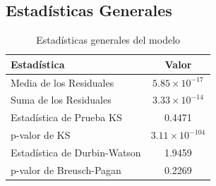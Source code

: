 \documentclass[a4paper, 12pt]{article}
\begin{document}
\subsection{Estadísticas Generales}
\begin{table}[h]
    \centering
    \begin{tabular}{l c}
        \toprule
        \textbf{Estadística} & \textbf{Valor} \\
        \midrule
        Media de los Residuales & $5.85 \times 10^{-17}$ \\
        Suma de los Residuales & $3.33 \times 10^{-14}$ \\
        Estadística de Prueba KS & 0.4471 \\
        p-valor de KS & $3.11 \times 10^{-104}$ \\
        Estadística de Durbin-Watson & 1.9459 \\
        p-valor de Breusch-Pagan & 0.2269 \\
        \bottomrule
    \end{tabular}
    \caption{Estadísticas generales del modelo}
\end{table}

\newpage
\end{document}
